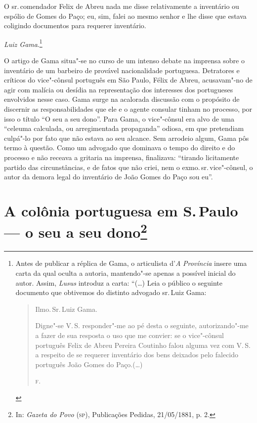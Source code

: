 O sr.\,comendador Felix de Abreu nada me disse relativamente a inventário
ou espólio de Gomes do Paço; eu, sim, falei ao mesmo senhor e lhe disse
que estava coligindo documentos para requerer inventário.

\bigskip

\hfill\emph{Luiz Gama}.\footnote{Antes de publicar a réplica de Gama, o
  articulista d'\emph{A} \emph{Província} insere uma carta da qual
  oculta a autoria, mantendo"-se apenas a possível inicial do autor.
  Assim, \emph{Lusus} introduz a carta: ``(\ldots{}) Leia o público o seguinte
  documento que obtivemos do distinto advogado sr.\,Luiz Gama:

\begin{quote}\footnotesize
Ilmo.\,Sr.\,Luiz Gama.

  Digne"-se V.\,S. responder"-me ao pé desta o seguinte, autorizando"-me a
  fazer de sua resposta o uso que me convier: se o vice"-cônsul português
  Felix de Abreu Pereira Coutinho falou alguma vez com V.\,S. a respeito
  de se requerer inventário dos bens deixados pelo falecido português
  João Gomes do Paço.(\ldots{})

  \hfill\textsc{f}.
  \end{quote}}

\pagebreak
\mbox{}\vfill
\thispagestyle{empty}

{\small\noindent
O artigo de Gama situa"-se no
curso de um intenso debate na imprensa sobre o inventário de um barbeiro
de provável nacionalidade portuguesa. Detratores e críticos do
vice"-cônsul português em São Paulo, Félix de Abreu, acusavam"-no de agir
com malícia ou desídia na representação dos interesses dos portugueses
envolvidos nesse caso. Gama surge na acalorada discussão com o propósito
de discernir as responsabilidades que ele e o agente consular tinham no
processo, por isso o título ``O seu a seu dono''. Para Gama, o vice"-cônsul
era alvo de uma ``celeuma calculada, ou arregimentada propaganda'' odiosa,
em que pretendiam culpá"-lo por fato que não estava ao seu alcance. Sem
arrodeio algum, Gama pôs termo à questão. Como um advogado que dominava
o tempo do direito e do processo e não receava a gritaria na imprensa,
finalizava: ``tirando licitamente partido das circunstâncias, e de
fatos que não criei, nem o exmo.\,sr.\,vice"-cônsul, o autor da demora
legal do inventário de João Gomes do Paço sou eu''. }

\chapter{A colônia portuguesa em S.\,Paulo --- o seu a seu
dono\footnote[*]{In: \emph{Gazeta do Povo} (\textsc{sp}), Publicações Pedidas,
  21/05/1881, p. 2.}}



